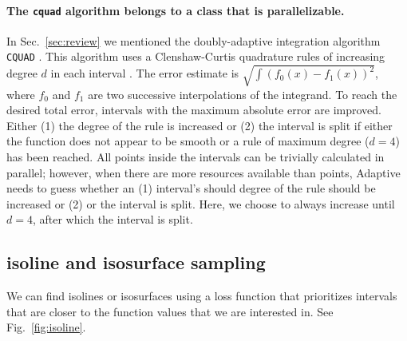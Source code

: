 \hypertarget{the-cquad-algorithm-belongs-to-a-class-that-is-parallelizable.}{%
\paragraph{\texorpdfstring{The \texttt{cquad} algorithm belongs to a class that is parallelizable.}{The cquad algorithm belongs to a class that is parallelizable.}}\label{the-cquad-algorithm-belongs-to-a-class-that-is-parallelizable.}}

In Sec.~\ref{sec:review} we mentioned the doubly-adaptive integration algorithm \passthrough{\lstinline!CQUAD!} \cite{Gonnet2010}.
This algorithm uses a Clenshaw-Curtis quadrature rules of increasing degree $d$ in each interval \cite{Clenshaw1960}.
The error estimate is $\sqrt{\int{\left(f_0(x) - f_1(x)\right)^2}}$, where $f_0$ and $f_1$ are two successive interpolations of the integrand.
To reach the desired total error, intervals with the maximum absolute error are improved.
Either (1) the degree of the rule is increased or (2) the interval is split if either the function does not appear to be smooth or a rule of maximum degree ($d=4$) has been reached.
All points inside the intervals can be trivially calculated in parallel; however, when there are more resources available than points, Adaptive needs to guess whether an (1) interval's should degree of the rule should be increased or (2) or the interval is split.
Here, we choose to always increase until $d=4$, after which the interval is split.

\hypertarget{isoline-and-isosurface-sampling}{%
\subsection{isoline and isosurface sampling}\label{isoline-and-isosurface-sampling}}

We can find isolines or isosurfaces using a loss function that prioritizes intervals that are closer to the function values that we are interested in.
See Fig.~\ref{fig:isoline}.


